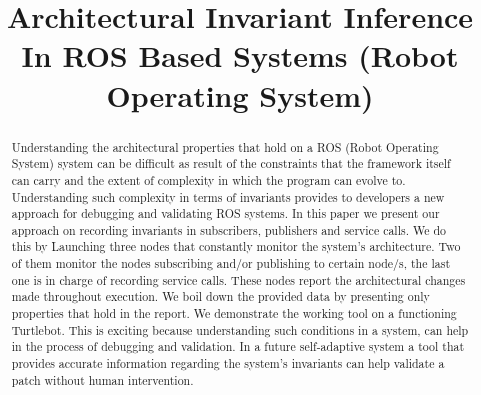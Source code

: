 \documentclass[10pt, conference]{IEEEtran}
\begin{document}
%
\title{Architectural Invariant Inference In ROS Based Systems (Robot Operating System)}



\author{
}
\maketitle


\begin{abstract}
Understanding the architectural properties that hold on a ROS (Robot Operating System) system can be difficult as result of the constraints that the framework itself can carry and the extent of complexity in which the program can evolve to. Understanding such complexity in terms of invariants provides to developers a new approach for debugging and validating ROS systems. In this paper we present our approach on recording invariants in subscribers, publishers and service calls. We do this by Launching three nodes that constantly monitor the system's architecture. Two of them monitor the nodes subscribing and/or publishing to certain node/s, the last one is in charge of recording service calls. These nodes report the architectural changes made throughout execution. We boil down the provided data by presenting only properties that hold in the report. We demonstrate the working tool on a functioning Turtlebot. This is exciting because understanding such conditions in a system, can help in the process of debugging and validation. In a future self-adaptive system a tool that provides accurate information regarding the system's invariants can help validate a patch without human intervention. 
\end{abstract}
\IEEEpeerreviewmaketitle
\end{document}
